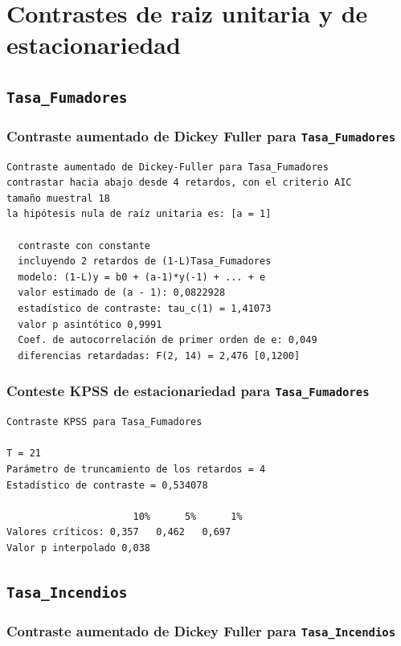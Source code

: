 \documentclass[10pt]{article}
\begin{document}
\section*{Contrastes de raiz unitaria y de estacionariedad}
\label{sec:org3ac1b04}
\subsection*{\texttt{Tasa\_Fumadores}}
\label{sec:org7cb5c4c}
\subsubsection*{Contraste aumentado de Dickey Fuller para \texttt{Tasa\_Fumadores}}
\label{sec:orge655d85}

{\footnotesize
\begin{verbatim}
Contraste aumentado de Dickey-Fuller para Tasa_Fumadores
contrastar hacia abajo desde 4 retardos, con el criterio AIC
tamaño muestral 18
la hipótesis nula de raíz unitaria es: [a = 1]

  contraste con constante 
  incluyendo 2 retardos de (1-L)Tasa_Fumadores
  modelo: (1-L)y = b0 + (a-1)*y(-1) + ... + e
  valor estimado de (a - 1): 0,0822928
  estadístico de contraste: tau_c(1) = 1,41073
  valor p asintótico 0,9991
  Coef. de autocorrelación de primer orden de e: 0,049
  diferencias retardadas: F(2, 14) = 2,476 [0,1200]
\end{verbatim}
}
\subsubsection*{Conteste KPSS de estacionariedad para \texttt{Tasa\_Fumadores}}
\label{sec:orgc85c8a2}

{\footnotesize
\begin{verbatim}
Contraste KPSS para Tasa_Fumadores

T = 21
Parámetro de truncamiento de los retardos = 4
Estadístico de contraste = 0,534078

                      10%      5%      1%
Valores críticos: 0,357   0,462   0,697
Valor p interpolado 0,038
\end{verbatim}
}
\subsection*{\texttt{Tasa\_Incendios}}
\label{sec:org0446c40}

\subsubsection*{Contraste aumentado de Dickey Fuller para \texttt{Tasa\_Incendios}}
\label{sec:org47b8f8f}
\end{document}
